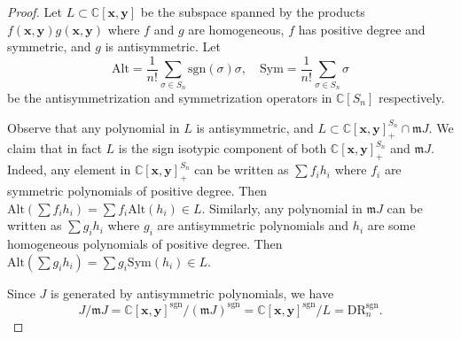 \documentclass[10pt,a4paper]{amsart}
\newcommand{\Alt}{\mathrm{Alt}}
\newcommand{\C}{\mathbb{C}}
\newcommand{\DR}{\mathrm{DR}}
\newcommand{\Sym}{\mathrm{Sym}}
\newcommand{\mm}{\mathfrak{m}}
\newcommand{\sgn}{\mathrm{sgn}}
\newcommand{\xx}{\mathbf{x}}
\newcommand{\yy}{\mathbf{y}}
\begin{document}
\begin{proof}
Let $L\subset \C[\xx,\yy]$ be the subspace spanned by the products $f(\xx,\yy)g(\xx,\yy)$ where $f$ and $g$ are homogeneous, $f$ has positive degree and symmetric, and $g$ is antisymmetric. Let 
$$
\Alt=\frac{1}{n!}\sum_{\sigma\in S_n}\sgn(\sigma)\sigma,\quad 
\Sym=\frac{1}{n!}\sum_{\sigma\in S_n}\sigma
$$
be the antisymmetrization and symmetrization operators in $\C[S_n]$ respectively.

Observe that any polynomial in $L$ is antisymmetric, and $L\subset \C[\xx,\yy]^{S_n}_{+}\cap \mm J$.  We claim that in fact $L$ is the sign isotypic component of both $\C[\xx,\yy]^{S_n}_{+}$ and $\mm J$. 
Indeed, any element in $\C[\xx,\yy]^{S_n}_{+}$ can be written as $\sum f_ih_i$ where $f_i$ are symmetric polynomials of positive degree. Then $\Alt(\sum f_ih_i)=\sum f_i\Alt(h_i)\in L$.
Similarly, any polynomial in $\mm J$ can be written as 
$\sum g_i h_i$ where $g_i$ are antisymmetric polynomials and $h_i$ are some homogeneous polynomials of positive degree. Then $\Alt(\sum g_ih_i)=\sum g_i\Sym(h_i)\in L$.

Since $J$ is generated by antisymmetric polynomials, we have
$$
J/\mm J=\C[\xx,\yy]^{\sgn}/(\mm J)^{\sgn}=\C[\xx,\yy]^{\sgn}/L=\DR_n^{\sgn}.
$$
\end{proof}
\end{document}
